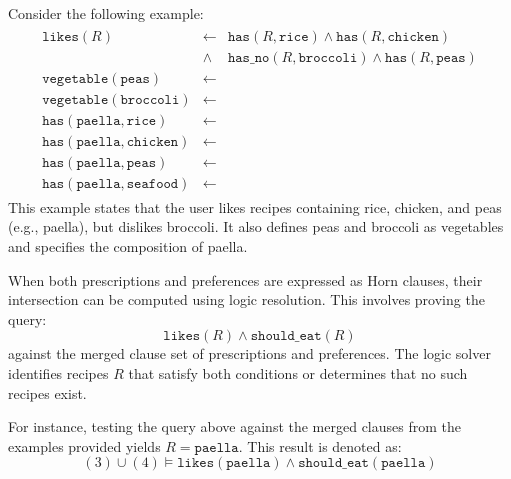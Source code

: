 %
Consider the following example:
%
\begin{align*}
  \begin{array}{rcl}
    \texttt{likes}(R) &\leftarrow& \texttt{has}(R, \texttt{rice}) \land \texttt{has}(R, \texttt{chicken}) \\
                      &\land& \texttt{has\_no}(R, \texttt{broccoli}) \land \texttt{has}(R, \texttt{peas}) \\
    \texttt{vegetable}(\texttt{peas}) &\leftarrow \\
    \texttt{vegetable}(\texttt{broccoli}) &\leftarrow \\
    \texttt{has}(\texttt{paella}, \texttt{rice}) &\leftarrow \\
    \texttt{has}(\texttt{paella}, \texttt{chicken}) &\leftarrow \\
    \texttt{has}(\texttt{paella}, \texttt{peas}) &\leftarrow \\
    \texttt{has}(\texttt{paella}, \texttt{seafood}) &\leftarrow
  \end{array}
\end{align*}
%
This example states that the user likes recipes containing rice, chicken, and peas (e.g., paella), but dislikes broccoli.
%
It also defines peas and broccoli as vegetables and specifies the composition of paella.

%
When both prescriptions and preferences are expressed as Horn clauses, their intersection can be computed using logic resolution.
%
This involves proving the query:
%
\begin{equation}
    \label{eq:intersection-prescriptions-preferences}
    \texttt{likes}(R) \land \texttt{should\_eat}(R)
\end{equation}
%
against the merged clause set of prescriptions and preferences.
%
The logic solver identifies recipes \( R \) that satisfy both conditions or determines that no such recipes exist.

%
For instance, testing the query above against the merged clauses from the examples provided yields \( R = \texttt{paella} \).
%
This result is denoted as:
%
\begin{equation}
  \label{eq:intersection-prescriptions-preferences-final}
  (3) \cup (4) \models \texttt{likes}(\texttt{paella}) \land \texttt{should\_eat}(\texttt{paella})
\end{equation}



